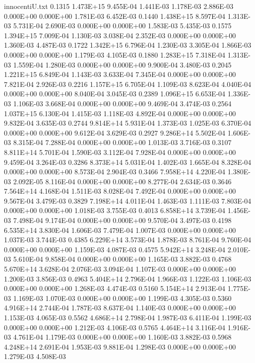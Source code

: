 \begin{filecontents}{innocentiU.txt}
0.1315 1.473E+15 9.455E-04 1.441E-03 1.178E-03 2.886E-03 0.000E+00 0.000E+00 1.781E-03 6.452E-03
0.1440 1.438E+15 8.597E-04 1.313E-03 5.731E-04 2.690E-03 0.000E+00 0.000E+00 1.583E-03 5.435E-03
0.1575 1.394E+15 7.009E-04 1.130E-03 3.038E-04 2.352E-03 0.000E+00 0.000E+00 1.360E-03 4.487E-03
0.1722 1.342E+15 6.796E-04 1.230E-03 3.305E-04 1.866E-03 0.000E+00 0.000E+00 1.179E-03 4.105E-03
0.1880 1.283E+15 7.318E-04 1.313E-03 1.559E-04 1.280E-03 0.000E+00 0.000E+00 9.900E-04 3.480E-03
0.2045 1.221E+15 6.849E-04 1.143E-03 3.633E-04 7.345E-04 0.000E+00 0.000E+00 7.821E-04 2.926E-03
0.2216 1.157E+15 6.705E-04 1.109E-03 8.623E-04 4.040E-04 0.000E+00 0.000E+00 8.040E-04 3.045E-03
0.2389 1.096E+15 6.653E-04 1.336E-03 1.106E-03 3.668E-04 0.000E+00 0.000E+00 9.469E-04 3.474E-03
0.2564 1.037E+15 6.130E-04 1.415E-03 1.118E-03 4.892E-04 0.000E+00 0.000E+00 9.832E-04 3.635E-03
0.2744 9.814E+14 5.931E-04 1.373E-03 1.025E-03 6.370E-04 0.000E+00 0.000E+00 9.612E-04 3.629E-03
0.2927 9.286E+14 5.502E-04 1.606E-03 8.315E-04 7.288E-04 0.000E+00 0.000E+00 1.013E-03 3.716E-03
0.3107 8.811E+14 5.701E-04 1.590E-03 3.112E-04 7.928E-04 0.000E+00 0.000E+00 9.459E-04 3.264E-03
0.3286 8.373E+14 5.031E-04 1.402E-03 1.665E-04 8.328E-04 0.000E+00 0.000E+00 8.573E-04 2.904E-03
0.3466 7.958E+14 4.220E-04 1.380E-03 2.092E-05 8.116E-04 0.000E+00 0.000E+00 8.277E-04 2.634E-03
0.3646 7.564E+14 4.168E-04 1.511E-03 8.028E-04 7.492E-04 0.000E+00 0.000E+00 9.567E-04 3.479E-03
0.3829 7.198E+14 4.011E-04 1.463E-03 1.111E-03 7.803E-04 0.000E+00 0.000E+00 1.018E-03 3.755E-03
0.4013 6.858E+14 3.739E-04 1.456E-03 7.498E-04 9.174E-04 0.000E+00 0.000E+00 9.570E-04 3.497E-03
0.4198 6.535E+14 3.830E-04 1.606E-03 7.479E-04 1.007E-03 0.000E+00 0.000E+00 1.037E-03 3.744E-03
0.4385 6.229E+14 3.573E-04 1.878E-03 8.761E-04 9.760E-04 0.000E+00 0.000E+00 1.159E-03 4.087E-03
0.4575 5.942E+14 3.248E-04 2.010E-03 5.610E-04 9.858E-04 0.000E+00 0.000E+00 1.165E-03 3.882E-03
0.4768 5.670E+14 3.628E-04 2.076E-03 3.094E-04 1.107E-03 0.000E+00 0.000E+00 1.200E-03 3.856E-03
0.4963 5.404E+14 2.796E-04 1.966E-03 1.122E-03 1.106E-03 0.000E+00 0.000E+00 1.268E-03 4.474E-03
0.5160 5.154E+14 2.913E-04 1.775E-03 1.169E-03 1.070E-03 0.000E+00 0.000E+00 1.199E-03 4.305E-03
0.5360 4.916E+14 2.744E-04 1.787E-03 8.637E-04 1.140E-03 0.000E+00 0.000E+00 1.153E-03 4.065E-03
0.5562 4.686E+14 2.798E-04 1.987E-03 6.411E-04 1.199E-03 0.000E+00 0.000E+00 1.212E-03 4.106E-03
0.5765 4.464E+14 3.116E-04 1.916E-03 4.761E-04 1.179E-03 0.000E+00 0.000E+00 1.160E-03 3.882E-03
0.5968 4.248E+14 2.691E-04 1.953E-03 9.881E-04 1.298E-03 0.000E+00 0.000E+00 1.279E-03 4.508E-03

\end{filecontents}
